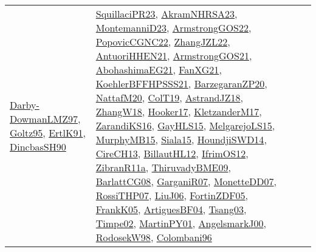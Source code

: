{\begin{longtable}{lp{3cm}>{\raggedright}p{6cm}>{\raggedright}p{6cm}p{8cm}}
\href{articles/Darby-DowmanLMZ97.pdf}{Darby-DowmanLMZ97}\cite{Darby-DowmanLMZ97}, \href{papers/Goltz95.pdf}{Goltz95}\cite{Goltz95}, \href{papers/ErtlK91.pdf}{ErtlK91}\cite{ErtlK91}, \href{articles/DincbasSH90.pdf}{DincbasSH90}\cite{DincbasSH90} & \href{papers/SquillaciPR23.pdf}{SquillaciPR23}\cite{SquillaciPR23}, \href{articles/AkramNHRSA23.pdf}{AkramNHRSA23}\cite{AkramNHRSA23}, \href{articles/MontemanniD23.pdf}{MontemanniD23}\cite{MontemanniD23}, \href{papers/ArmstrongGOS22.pdf}{ArmstrongGOS22}\cite{ArmstrongGOS22}, \href{papers/PopovicCGNC22.pdf}{PopovicCGNC22}\cite{PopovicCGNC22}, \href{papers/ZhangJZL22.pdf}{ZhangJZL22}\cite{ZhangJZL22}, \href{papers/AntuoriHHEN21.pdf}{AntuoriHHEN21}\cite{AntuoriHHEN21}, \href{papers/ArmstrongGOS21.pdf}{ArmstrongGOS21}\cite{ArmstrongGOS21}, \href{articles/AbohashimaEG21.pdf}{AbohashimaEG21}\cite{AbohashimaEG21}, \href{articles/FanXG21.pdf}{FanXG21}\cite{FanXG21}, \href{articles/KoehlerBFFHPSSS21.pdf}{KoehlerBFFHPSSS21}\cite{KoehlerBFFHPSSS21}, \href{papers/BarzegaranZP20.pdf}{BarzegaranZP20}\cite{BarzegaranZP20}, \href{papers/NattafM20.pdf}{NattafM20}\cite{NattafM20}, \href{papers/ColT19.pdf}{ColT19}\cite{ColT19}, \href{papers/AstrandJZ18.pdf}{AstrandJZ18}\cite{AstrandJZ18}, \href{articles/ZhangW18.pdf}{ZhangW18}\cite{ZhangW18}, \href{papers/Hooker17.pdf}{Hooker17}\cite{Hooker17}, \href{papers/KletzanderM17.pdf}{KletzanderM17}\cite{KletzanderM17}, \href{articles/ZarandiKS16.pdf}{ZarandiKS16}\cite{ZarandiKS16}, \href{papers/GayHLS15.pdf}{GayHLS15}\cite{GayHLS15}, \href{papers/MelgarejoLS15.pdf}{MelgarejoLS15}\cite{MelgarejoLS15}, \href{papers/MurphyMB15.pdf}{MurphyMB15}\cite{MurphyMB15}, \href{articles/Siala15.pdf}{Siala15}\cite{Siala15}, \href{papers/HoundjiSWD14.pdf}{HoundjiSWD14}\cite{HoundjiSWD14}, \href{papers/CireCH13.pdf}{CireCH13}\cite{CireCH13}, \href{papers/BillautHL12.pdf}{BillautHL12}\cite{BillautHL12}, \href{papers/IfrimOS12.pdf}{IfrimOS12}\cite{IfrimOS12}, \href{papers/ZibranR11a.pdf}{ZibranR11a}\cite{ZibranR11a}, \href{papers/ThiruvadyBME09.pdf}{ThiruvadyBME09}\cite{ThiruvadyBME09}, \href{papers/BarlattCG08.pdf}{BarlattCG08}\cite{BarlattCG08}, \href{papers/GarganiR07.pdf}{GarganiR07}\cite{GarganiR07}, \href{papers/MonetteDD07.pdf}{MonetteDD07}\cite{MonetteDD07}, \href{papers/RossiTHP07.pdf}{RossiTHP07}\cite{RossiTHP07}, \href{papers/LiuJ06.pdf}{LiuJ06}\cite{LiuJ06}, \href{papers/FortinZDF05.pdf}{FortinZDF05}\cite{FortinZDF05}, \href{papers/FrankK05.pdf}{FrankK05}\cite{FrankK05}, \href{papers/ArtiguesBF04.pdf}{ArtiguesBF04}\cite{ArtiguesBF04}, \href{articles/Tsang03.pdf}{Tsang03}\cite{Tsang03}, \href{articles/Timpe02.pdf}{Timpe02}\cite{Timpe02}, \href{articles/MartinPY01.pdf}{MartinPY01}\cite{MartinPY01}, \href{papers/AngelsmarkJ00.pdf}{AngelsmarkJ00}\cite{AngelsmarkJ00}, \href{papers/RodosekW98.pdf}{RodosekW98}\cite{RodosekW98}, \href{papers/Colombani96.pdf}{Colombani96}\cite{Colombani96}\\

\end{longtable}}
